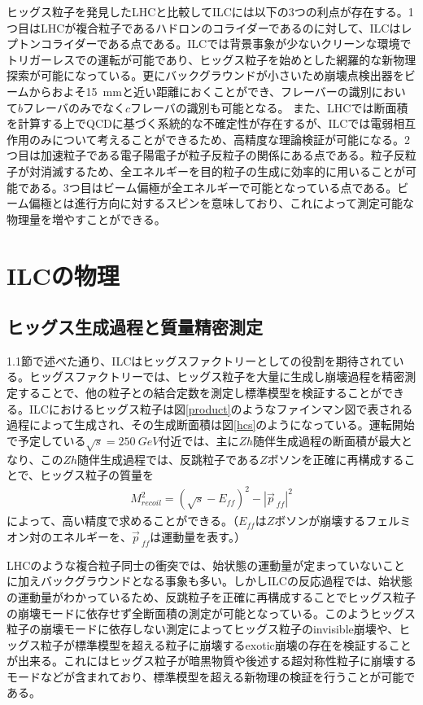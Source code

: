 ヒッグス粒子を発見したLHCと比較してILCには以下の3つの利点が存在する。1つ目はLHCが複合粒子であるハドロンのコライダーであるのに対して、ILCはレプトンコライダーである点である。ILCでは背景事象が少ないクリーンな環境でトリガーレスでの運転が可能であり、ヒッグス粒子を始めとした網羅的な新物理探索が可能になっている。更にバックグラウンドが小さいため崩壊点検出器をビームからおよそ\SI{15}{mm}と近い距離におくことができ、フレーバーの識別において$b$フレーバのみでなく$c$フレーバの識別も可能となる。
また、LHCでは断面積を計算する上でQCDに基づく系統的な不確定性が存在するが、ILCでは電弱相互作用のみについて考えることができるため、高精度な理論検証が可能になる。2つ目は加速粒子である電子陽電子が粒子反粒子の関係にある点である。粒子反粒子が対消滅するため、全エネルギーを目的粒子の生成に効率的に用いることが可能である。3つ目はビーム偏極が全エネルギーで可能となっている点である。ビーム偏極とは進行方向に対するスピンを意味しており、これによって測定可能な物理量を増やすことができる。
\section{ILCの物理}
\subsection{ヒッグス生成過程と質量精密測定}
1.1節で述べた通り、ILCはヒッグスファクトリーとしての役割を期待されている。ヒッグスファクトリーでは、ヒッグス粒子を大量に生成し崩壊過程を精密測定することで、他の粒子との結合定数を測定し標準模型を検証することができる。ILCにおけるヒッグス粒子は図\ref{product}のようなファインマン図で表される過程によって生成され、その生成断面積は図\ref{hcs}のようになっている。運転開始で予定している$\sqrt{s}=\SI{250}{GeV}$付近では、主に$Zh$随伴生成過程の断面積が最大となり、この$Zh$随伴生成過程では、反跳粒子である$Z$ボソンを正確に再構成することで、ヒッグス粒子の質量を
\begin{align}
\label{recoil}
M_{recoil}^2 = {( \sqrt{s} - E_{ff} )}^2 - {|\vec{p}_{\ ff}|}^2
\end{align}
によって、高い精度で求めることができる。（$E_{ff}$は$Z$ボソンが崩壊するフェルミオン対のエネルギーを、$\vec{p}_{\ ff}$は運動量を表す。）

LHCのような複合粒子同士の衝突では、始状態の運動量が定まっていないことに加えバックグラウンドとなる事象も多い。しかしILCの反応過程では、始状態の運動量がわかっているため、反跳粒子を正確に再構成することでヒッグス粒子の崩壊モードに依存せず全断面積の測定が可能となっている。このようヒッグス粒子の崩壊モードに依存しない測定によってヒッグス粒子のinvisible崩壊や、ヒッグス粒子が標準模型を超える粒子に崩壊するexotic崩壊の存在を検証することが出来る。これにはヒッグス粒子が暗黒物質や後述する超対称性粒子に崩壊するモードなどが含まれており、標準模型を超える新物理の検証を行うことが可能である。

